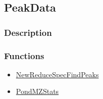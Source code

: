 \subsection{PeakData}\label{PeakData}
\subsubsection{Description}


\subsubsection{Functions}
\begin{itemize}
\item \hyperref[NewReduceSpecFindPeaks]{NewReduceSpecFindPeaks}
\item \hyperref[PondMZStats]{PondMZStats}
\end{itemize}


